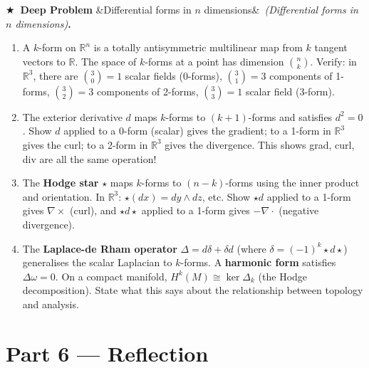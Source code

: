 \documentclass[12pt,a4paper]{article}
\newcounter{problem}
\newcounter{deepproblem}
\newenvironment{deepproblem}[1][]{\refstepcounter{deepproblem}\par\vspace{6pt}\noindent\textbf{\color{NavyBlue}$\bigstar$\ Deep Problem \thedeepproblem}\ifx&#1&\else\ \textit{(#1)}\fi\textbf{.}\enskip}{\par\vspace{4pt}}
\begin{document}
\begin{deepproblem}[Differential forms in $n$ dimensions]
\begin{enumerate}[label=(\alph*)]
  \item A $k$-form on $\mathbb{R}^n$ is a totally antisymmetric multilinear map from $k$ tangent vectors to $\mathbb{R}$. The space of $k$-forms at a point has dimension $\binom{n}{k}$. Verify: in $\mathbb{R}^3$, there are $\binom{3}{0}=1$ scalar fields (0-forms), $\binom{3}{1}=3$ components of 1-forms, $\binom{3}{2}=3$ components of 2-forms, $\binom{3}{3}=1$ scalar field (3-form).
  \item The exterior derivative $d$ maps $k$-forms to $(k+1)$-forms and satisfies $d^2=0$. Show $d$ applied to a 0-form (scalar) gives the gradient; to a 1-form in $\mathbb{R}^3$ gives the curl; to a 2-form in $\mathbb{R}^3$ gives the divergence. This shows grad, curl, div are all the same operation!
  \item The \textbf{Hodge star} $\star$ maps $k$-forms to $(n-k)$-forms using the inner product and orientation. In $\mathbb{R}^3$: $\star(dx)=dy\wedge dz$, etc. Show $\star d$ applied to a 1-form gives $\nabla\times$ (curl), and $\star d\star$ applied to a 1-form gives $-\nabla\cdot$ (negative divergence).
  \item The \textbf{Laplace-de Rham operator} $\Delta = d\delta+\delta d$ (where $\delta=(-1)^k\star d\star$) generalises the scalar Laplacian to $k$-forms. A \textbf{harmonic form} satisfies $\Delta\omega=0$. On a compact manifold, $H^k(M)\cong\ker\Delta_k$ (the Hodge decomposition). State what this says about the relationship between topology and analysis.
\end{enumerate}
\end{deepproblem}

\section{Part 6 \texorpdfstring{---}{--} Reflection}
\end{document}
